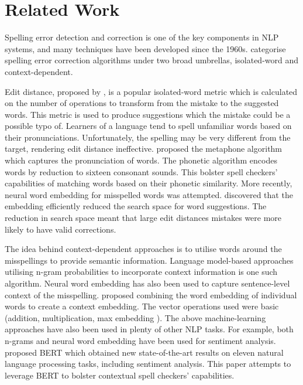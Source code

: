 \documentclass[11pt,a4paper]{article}
\begin{document}
\section{Related Work}
Spelling error detection and correction is one of the key components in NLP systems, and many techniques have been developed since the 1960s. \citet{typesOfErrorDet} categorise spelling error correction algorithms under two broad umbrellas, isolated-word and context-dependent. 

Edit distance, proposed by \citet{editdistance}, is a popular isolated-word metric which is calculated on the number of operations to transform from the mistake to the suggested words. This metric is used to produce suggestions which the mistake could be a possible typo of. Learners of a language tend to spell unfamiliar words based on their pronunciations. Unfortunately, the spelling may be very different from the target, rendering edit distance ineffective. \citet{metaphone} proposed the metaphone algorithm which captures the pronunciation of words. The phonetic algorithm encodes words by reduction to sixteen consonant sounds. This bolster spell checkers' capabilities of matching words based on their phonetic similarity. More recently, neural word embedding for misspelled words was attempted. \citet{subwordembedding} discovered that the embedding efficiently reduced the search space for word suggestions. The reduction in search space meant that large edit distances mistakes were more likely to have valid corrections. 

The idea behind context-dependent approaches is to utilise words around the misspellings to provide semantic information. Language model-based approaches \cite{googleweb} utilising n-gram probabilities to incorporate context information is one such algorithm. Neural word embedding has also been used to capture sentence-level context of the misspelling. \citet{sentenceembedding} proposed combining the word embedding of individual words to create a context embedding. The vector operations used were basic (addition, multiplication, max embedding \cite{maxembedding}). The above machine-learning approaches have also been used in plenty of other NLP tasks. For example, both n-grams \cite{sentingram} and neural word embedding \cite{nnsenti} have been used for sentiment analysis. \citet{bert} proposed BERT which obtained new state-of-the-art results on eleven natural language processing tasks, including sentiment analysis. This paper attempts to leverage BERT to bolster contextual spell checkers' capabilities. 
\end{document}
